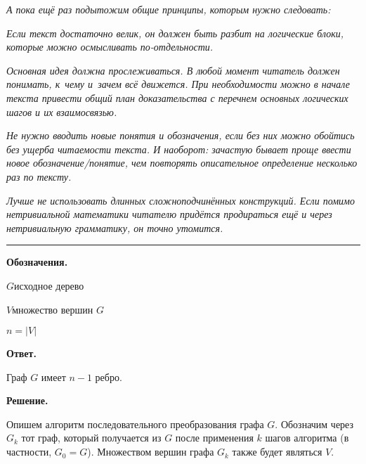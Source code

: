 \documentclass[a4paper,12pt]{article}
\begin{document}
\emph{
А пока ещё раз подытожим общие принципы, которым нужно следовать:
}
\begin{nums}{-3}
\item
\emph{Если текст достаточно велик, он должен быть разбит на логические блоки, которые можно осмысливать по-отдельности.}
\item
\emph{Основная идея должна прослеживаться. В любой момент читатель должен понимать, к~чему и~зачем всё движется. При необходимости можно в начале текста привести общий план доказательства с перечнем основных логических шагов и их взаимосвязью.}
\item
\emph{Не нужно вводить новые понятия и обозначения, если без них можно обойтись без ущерба читаемости текста. И наоборот: зачастую бывает проще ввести новое обозначение/понятие, чем повторять описательное определение несколько раз по тексту.}
\item
\emph{Лучше не использовать длинных сложноподчинённых конструкций. Если помимо нетривиальной математики читателю придётся продираться ещё и через нетривиальную грамматику, он точно утомится.}
\end{nums}

\newpage

\bigskip
\hrule
\medskip
{\bf Обозначения.}

$G$\т исходное дерево

$V$\т множество вершин $G$

$n = |V|$

{\bf Ответ.}

Граф $G$ имеет $n-1$ ребро.

{\bf Решение.}

Опишем алгоритм последовательного преобразования графа $G$. Обозначим через $G_k$ тот граф, который получается из $G$ после применения $k$ шагов алгоритма (в частности, $G_0 = G$). Множеством вершин графа $G_k$ также будет являться $V$.
\end{document}
